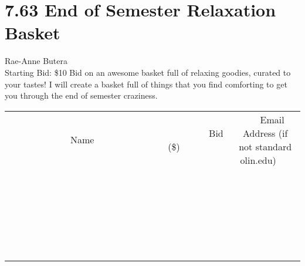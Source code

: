 \documentclass[11pt]{article}
\begin{document}
\section*{7.63 End of Semester Relaxation Basket}
Rae-Anne Butera
\\
Starting Bid: \$10
\newline
Bid on an awesome basket full of relaxing goodies, curated to your tastes! I will create a basket full of things that you find comforting to get you through the end of semester craziness.
\\[6ex]
\begin{tabular}{c c c}
~~~~~~~~~~~~~Name~~~~~~~~~~~~~ & ~~~~~~~~~Bid (\$)~~~~~~~~~  & ~~~Email Address (if not standard olin.edu)~~~\\
 & & \\
\hline
 & & \\
\hline
 & & \\
\hline
 & & \\
\hline
 & & \\
\hline
 & & \\
\hline
 & & \\
\hline
 & & \\
\hline
 & & \\
\hline
 & & \\
\hline
 & & \\
\hline
 & & \\
\hline
 & & \\
\hline
 & & \\
\hline
 & & \\
\hline
 & & \\
\hline
 & & \\
\hline
 & & \\
\hline
 & & \\
\hline
 & & \\
\hline
 & & \\
\hline
 & & \\
\hline
 & & \\
\hline
 & & \\
\hline
 & & \\
\hline
 & & \\
\hline
\end{tabular}
\newpage
\end{document}
